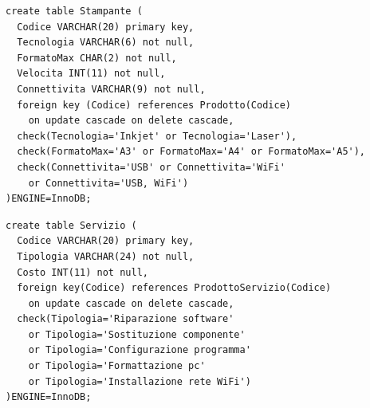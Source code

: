 \noindent{}
\newline\newline

\begin{verbatim}
create table Stampante (
  Codice VARCHAR(20) primary key,
  Tecnologia VARCHAR(6) not null,
  FormatoMax CHAR(2) not null,
  Velocita INT(11) not null,
  Connettivita VARCHAR(9) not null,
  foreign key (Codice) references Prodotto(Codice)
    on update cascade on delete cascade,
  check(Tecnologia='Inkjet' or Tecnologia='Laser'),
  check(FormatoMax='A3' or FormatoMax='A4' or FormatoMax='A5'),
  check(Connettivita='USB' or Connettivita='WiFi'
    or Connettivita='USB, WiFi')
)ENGINE=InnoDB;
\end{verbatim}
\vspace{0.5cm}

\noindent{}
\newline\newline

\begin{verbatim}
create table Servizio (
  Codice VARCHAR(20) primary key,
  Tipologia VARCHAR(24) not null,
  Costo INT(11) not null,
  foreign key(Codice) references ProdottoServizio(Codice)
    on update cascade on delete cascade,
  check(Tipologia='Riparazione software'
    or Tipologia='Sostituzione componente'
    or Tipologia='Configurazione programma'
    or Tipologia='Formattazione pc'
    or Tipologia='Installazione rete WiFi')
)ENGINE=InnoDB;
\end{verbatim}
\vspace{0.5cm}

\noindent{}
\newline\newline

